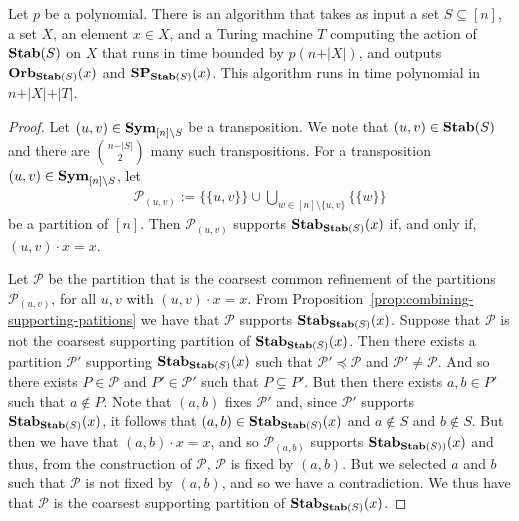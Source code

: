 \documentclass[../paper.tex]{subfiles}
\begin{document}
\begin{lem}
  \label{lem:computing-support-orbit}
  Let $p$ be a polynomial. There is an algorithm that takes as input a set $S
  \subseteq [n]$, a set $X$, an element $x \in X$, and a Turing machine $T$
  computing the action of $\text{\textbf{Stab}}(S)$ on $X$ that runs in time bounded by $p(n +
  \vert X \vert)$, and outputs $\text{\textbf{Orb}}_{\text{\textbf{Stab}}(S)} (x)$ and $\text{\textbf{SP}}_{\text{\textbf{Stab}}(S)}(x)$.
  This algorithm runs in time polynomial in $n + \vert X \vert + \vert T \vert$.
\end{lem}
\begin{proof}
  Let $(u, v) \in \text{\textbf{Sym}}_{[n] \setminus S}$ be a transposition. We note that
  $(u,v) \in \text{\textbf{Stab}}(S)$ and there are ${n - \vert S \vert}\choose{2}$ many such
  transpositions. For a transposition $(u, v) \in \text{\textbf{Sym}}_{[n] \setminus S}$, let
  \begin{align*}
    \mathcal{P}_{(u,v)} := \{ \{u,v\}\} \cup \bigcup_{w \in [n] \setminus \{ u,v \}} \{ \{ w \} \}
  \end{align*}
  be a partition of $[n]$. Then $\mathcal{P}_{(u,v)}$ supports
  $\text{\textbf{Stab}}_{\text{\textbf{Stab}}(S)}(x)$ if, and only if, $(u,v) \cdot x = x$.


Let  $\mathcal{P}$ be the partition that is the coarsest common
refinement of the partitions $\mathcal{P}_{(u,v)}$, for all $u,v$ with $(u,v) \cdot x = x$.
From
  Proposition~\ref{prop:combining-supporting-patitions} we have that
  $\mathcal{P}$ supports $\text{\textbf{Stab}}_{\text{\textbf{Stab}}(S)}(x)$. Suppose that $\mathcal{P}$ is
  not the coarsest supporting partition of $\text{\textbf{Stab}}_{\text{\textbf{Stab}}(S)}(x)$. Then there
  exists a partition $\mathcal{P}'$ supporting $\text{\textbf{Stab}}_{\text{\textbf{Stab}}(S)}(x)$ such that
  $\mathcal{P}' \preceq \mathcal{P}$ and $\mathcal{P}' \neq \mathcal{P}$. And so there
  exists $P \in \mathcal{P}$ and $P' \in \mathcal{P}'$ such that $P \subsetneq
  P'$. But then there exists $a , b \in P'$ such that $a \not\in P$. Note that
  $(a,b)$ fixes $\mathcal{P}'$ and, since $\mathcal{P}'$ supports
  $\text{\textbf{Stab}}_{\text{\textbf{Stab}}(S)}(x)$, it follows that $(a,b) \in \text{\textbf{Stab}}_{\text{\textbf{Stab}}(S)}(x)$ and $a
  \not\in S$ and $b \not\in S$. But then we have that $(a,b) \cdot x = x$, and
  so $\mathcal{P}_{(a,b)}$ supports $\text{\textbf{Stab}}_{\text{\textbf{Stab}}(S))}(x)$ and thus, from the
  construction of $\mathcal{P}$, $\mathcal{P}$ is fixed by $(a,b)$. But we
  selected $a$ and $b$ such that $\mathcal{P}$ is not fixed by $(a,b)$, and so
  we have a contradiction. We thus have that $\mathcal{P}$ is the coarsest
  supporting partition of $\text{\textbf{Stab}}_{\text{\textbf{Stab}}(S)}(x)$.


\end{proof}
\end{document}
